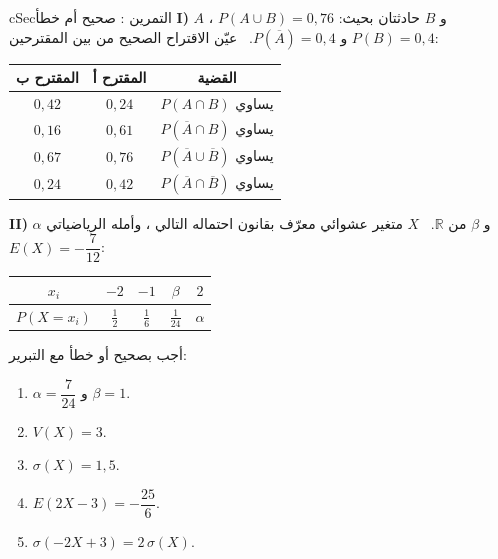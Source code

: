 \documentclass[12pt,a4paper]{article}
\newenvironment{BOX}[2]{\begin{otherlanguage}{english}\begin{arbox}{#1}{#2}}{\end{arbox}\end{otherlanguage}}
\newcounter{exo}
\newenvironment{tamrin}[1]{\stepcounter{exo}\begin{BOX}{cSec}{التمرين \theexo: #1}}{\end{BOX}}
\newcommand{\ar}[1]{\foreignlanguage{arabic}{#1}}
\newcommand{\R}{\mathbb{R}}
\begin{document}
\begin{tamrin}{صحيح أم خطأ}
\textbf{I)} $A$ و $B$ حادثتان بحيث: $P(A\cup B)=0{,}76$ ، $P(B)=0{,}4$ و $P(\overline A)=0{,}4$. \ عيّن الاقتراح الصحيح من بين المقترحين:
\begin{center}
\renewcommand{\arraystretch}{1.4}
\begin{tabular}{|c|c|C|}\hline
\ar{المقترح ب} & \ar{المقترح أ} & القضية\\
\hline
$0{,}42$ & $0{,}24$ & $P(A\cap B)$ يساوي\\
\hline
$0{,}16$ & $0{,}61$ & $P(\overline A\cap B)$ يساوي\\
\hline
$0{,}67$ & $0{,}76$ & $P(\overline A\cup\overline B)$ يساوي\\
\hline
$0{,}24$ & $0{,}42$ & $P(\overline A\cap\overline B)$ يساوي\\
\hline
\end{tabular}
\end{center}
\textbf{II)} $\alpha$ و $\beta$ من $\R$. \ $X$ متغير عشوائي معرّف بقانون احتماله التالي ، وأمله الرياضياتي $E(X)=-\dfrac{7}{12}$:
\begin{center}
\renewcommand{\arraystretch}{1.4}
\begin{tabular}{|C|c|c|c|c|}\hline
{}$x_i$ & $-2$ & $-1$ & $\beta$ & $2$\\
\hline
$P(X=x_i)$ & $\frac12$ & $\frac16$ & $\frac{1}{24}$ & $\alpha$\\
\hline
\end{tabular}
\end{center}
أجب بصحيح أو خطأ مع التبرير:
\begin{enumerate}
\item $\alpha=\dfrac{7}{24}$ و $\beta=1$.
\item $V(X)=3$.
\item $\sigma(X)=1{,}5$.
\item $E(2X-3)=-\dfrac{25}{6}$.
\item $\sigma(-2X+3)=2\,\sigma(X)$.
\end{enumerate}
\end{tamrin}
\end{document}
